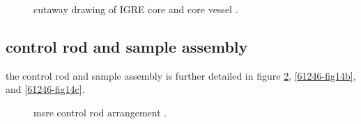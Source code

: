\documentclass{article}
\begin{document}
\begin{preview}
\begin{figure}[H]
  \caption{cutaway drawing of IGRE core and core vessel \parencite[figure 1]{ornl-tm-0378}.}
  \label{0378-fig1}
\end{figure}


\subsection{control rod and sample assembly}
the control rod and sample assembly is further detailed in figure \ref{61246-fig14a}, \ref{61246-fig14b}, and \ref{61246-fig14c}.
\begin{figure}[H]
  \centering
  \caption{msre control rod arrangement \parencite[figure 14a]{ad-cf-61-2-46}.}
  \label{61246-fig14a}
\end{figure}


\end{preview}
\end{document}
